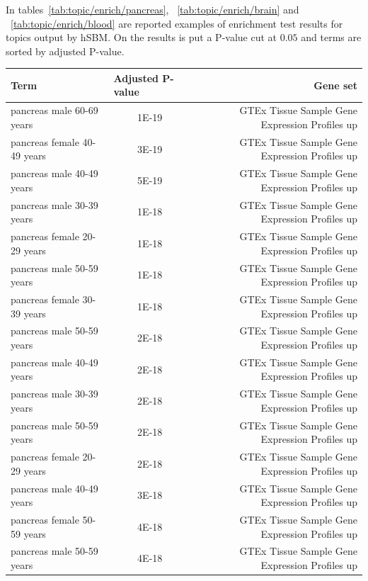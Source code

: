 In tables~\ref{tab:topic/enrich/pancreas}, ~\ref{tab:topic/enrich/brain} and ~\ref{tab:topic/enrich/blood} are reported examples of enrichment test results for topics output by hSBM. On the results is put a P-value cut at $0.05$ and terms are sorted by adjusted P-value.
\begin{table}[htb!]
	\tiny
	\begin{center}
		\begin{tabular}{|l|c|r|}
			\hline
			Term & \multicolumn{1}{l|}{Adjusted P-value} & Gene set \\ \hline
			pancreas male 60-69 years & 1E-19 & GTEx Tissue Sample Gene Expression Profiles up \\ \hline
			pancreas female 40-49 years & 3E-19 & GTEx Tissue Sample Gene Expression Profiles up \\ \hline
			pancreas male 40-49 years & 5E-19 & GTEx Tissue Sample Gene Expression Profiles up \\ \hline
			pancreas male 30-39 years & 1E-18 & GTEx Tissue Sample Gene Expression Profiles up \\ \hline
			pancreas female 20-29 years & 1E-18 & GTEx Tissue Sample Gene Expression Profiles up \\ \hline
			pancreas male 50-59 years & 1E-18 & GTEx Tissue Sample Gene Expression Profiles up \\ \hline
			pancreas female 30-39 years & 1E-18 & GTEx Tissue Sample Gene Expression Profiles up \\ \hline
			pancreas male 50-59 years & 2E-18 & GTEx Tissue Sample Gene Expression Profiles up \\ \hline
			pancreas male 40-49 years & 2E-18 & GTEx Tissue Sample Gene Expression Profiles up \\ \hline
			pancreas male 30-39 years & 2E-18 & GTEx Tissue Sample Gene Expression Profiles up \\ \hline
			pancreas male 50-59 years & 2E-18 & GTEx Tissue Sample Gene Expression Profiles up \\ \hline
			pancreas female 20-29 years & 2E-18 & GTEx Tissue Sample Gene Expression Profiles up \\ \hline
			pancreas male 40-49 years & 3E-18 & GTEx Tissue Sample Gene Expression Profiles up \\ \hline
			pancreas female 50-59 years & 4E-18 & GTEx Tissue Sample Gene Expression Profiles up \\ \hline
			pancreas male 50-59 years & 4E-18 & GTEx Tissue Sample Gene Expression Profiles up \\ \hline

\end{tabular}
\end{center}
\end{table}
